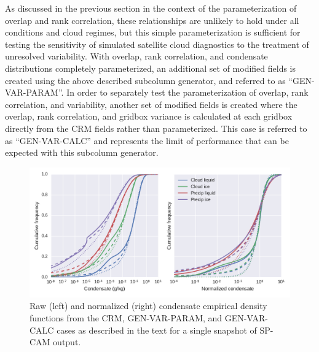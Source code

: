 As discussed in the previous section in the context of the
parameterization of overlap and rank correlation, these relationships
are unlikely to hold under all conditions and cloud regimes, but this
simple parameterization is sufficient for testing the sensitivity of
simulated satellite cloud diagnostics to the treatment of unresolved
variability. With overlap, rank correlation, and condensate
distributions completely parameterized, an additional set of modified
fields is created using the above described subcolumn generator, and
referred to as ``GEN-VAR-PARAM''. In order to separately test the
parameterization of overlap, rank correlation, and variability, another
set of modified fields is created where the overlap, rank correlation,
and gridbox variance is calculated at each gridbox directly from the CRM
fields rather than parameterized. This case is referred to as
``GEN-VAR-CALC'' and represents the limit of performance that can be
expected with this subcolumn generator.

\begin{figure}[htbp]
\centering
\includegraphics{graphics/subgrid2_mxratio_cdf2.pdf}
\caption{\label{fig:subgrid2_condensate_cdf2}Raw (left) and normalized
(right) condensate empirical density functions from the CRM,
GEN-VAR-PARAM, and GEN-VAR-CALC cases as described in the text for a
single snapshot of SP-CAM
output.}\label{fig:subgrid2ux5fcondensateux5fcdf2}
\end{figure}

